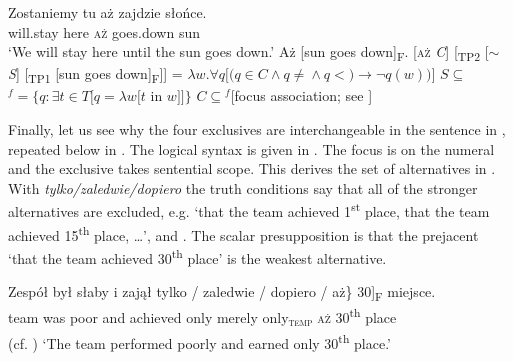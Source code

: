 \documentclass[output=paper,colorlinks,citecolor=brown]{langscibook}
\begin{document}
\ea\label{ex:tom:85}
\gll Zostaniemy tu aż zajdzie słońce.\\
will.stay here \textsc{aż} goes.down sun\\
\glt `We will stay here until the sun goes down.’
\ea\label{ex:tom:85b}      
Aż [sun goes down]\textsubscript{F}.
\ex\label{ex:tom:85c}     
{}[\textsc{aż} \textit{C}] [\textsubscript{TP2} [$\sim$ \textit{S}] [\textsubscript{TP1} [sun goes down]\textsubscript{F}]]
\ex\label{ex:tom:85d}     
 = $λw.\forall q [(q \in C\wedge q\neq{}$${}\wedge q <{}$$) → ¬q(w))]$
\ex\label{ex:tom:85e}      
$S\subseteq{}$$^f = \{q:\exists t\in T [q = λw [t$ in $w]]\}$
\ex\label{ex:tom:85f} 
$C\subseteq{}$$^f$\hfill [focus association; see ]
\z 
\z 

\noindent Finally, let us see why the four exclusives are interchangeable in the sentence in , repeated below in . The logical syntax is given in . The focus is on the numeral and the exclusive takes sentential scope. This derives the set of alternatives in . With \textit{tylko/zaledwie/dopiero} the truth conditions say that all of the stronger alternatives are excluded, e.g. ‘that the team achieved 1\textsuperscript{st} place, that the team achieved 15\textsuperscript{th} place, …’,  and . The scalar presupposition is that the prejacent ‘that the team achieved 30\textsuperscript{th} place’ is the weakest alternative. 

\ea\label{ex:tom:86}
\gll Zespół był słaby i zajął \minsp{\{} tylko / zaledwie / dopiero / aż\}   \minsp{[} 30]\textsubscript{F} miejsce.\\
team was poor and achieved {} only {} merely {} only\textsubscript{\textsc{temp}} {} \textsc{aż} {} 30\textsuperscript{th} place\\\hfill (cf. )
\glt `The team performed poorly and earned only 30\textsuperscript{th} place.’
\z 
\end{document}
